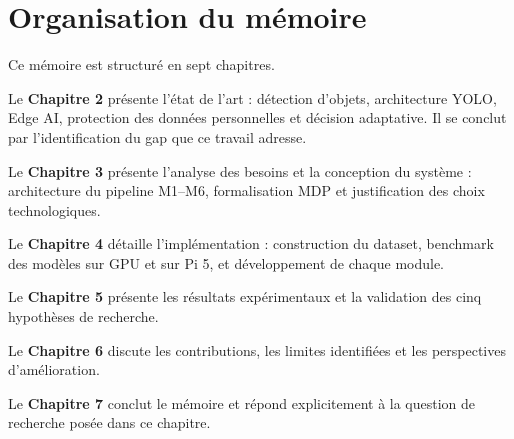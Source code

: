 \section{Organisation du mémoire}

Ce mémoire est structuré en sept chapitres.

Le \textbf{Chapitre 2} présente l'état de l'art :
détection d'objets, architecture YOLO, Edge AI,
protection des données personnelles et décision
adaptative. Il se conclut par l'identification
du gap que ce travail adresse.

Le \textbf{Chapitre 3} présente l'analyse des
besoins et la conception du système : architecture
du pipeline M1--M6, formalisation MDP et
justification des choix technologiques.

Le \textbf{Chapitre 4} détaille l'implémentation :
construction du dataset, benchmark des modèles
sur GPU et sur Pi 5, et développement de chaque
module.

Le \textbf{Chapitre 5} présente les résultats
expérimentaux et la validation des cinq hypothèses
de recherche.

Le \textbf{Chapitre 6} discute les contributions,
les limites identifiées et les perspectives
d'amélioration.

Le \textbf{Chapitre 7} conclut le mémoire et
répond explicitement à la question de recherche
posée dans ce chapitre.
